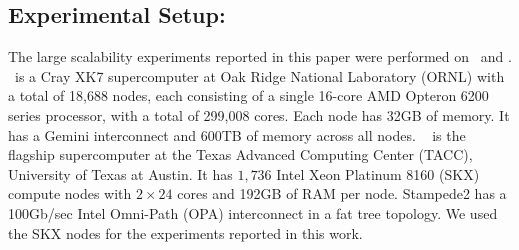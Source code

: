 \subsection{Experimental Setup:}

The large scalability experiments reported in this paper were
performed on \Titan~and \Stampede. \Titan~is a Cray XK7 supercomputer
at Oak Ridge National Laboratory (ORNL) with a total of 18,688
nodes, each consisting of a single 16-core AMD Opteron 6200 series
processor, with a total of 299,008 cores. Each node has 32GB of memory.
It has a Gemini interconnect and 600TB of memory across all nodes.
%
%
\Stampede~  is the flagship supercomputer at the Texas Advanced
Computing Center (TACC), University of Texas at Austin. 
It has $1,736$ Intel Xeon Platinum 8160 (SKX) compute nodes with $2\times 24$ cores and 192GB of RAM
per node. Stampede2 has a 100Gb/sec Intel Omni-Path
(OPA) interconnect in a fat tree topology. We used the SKX
nodes for the experiments reported in this work.





